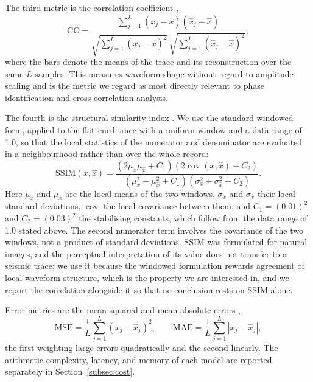\documentclass[fleqn,10pt]{wlscirep}
\begin{document}
The third metric is the correlation coefficient \cite{bendat2011random},
\begin{equation}
\mathrm{CC} =
\frac{\sum_{j=1}^{L} (x_j - \bar{x}) (\hat{x}_j - \bar{\hat{x}})}
     {\sqrt{\sum_{j=1}^{L} (x_j - \bar{x})^2} \, \sqrt{\sum_{j=1}^{L} (\hat{x}_j - \bar{\hat{x}})^2}} ,
\end{equation}
where the bars denote the means of the trace and its reconstruction over the same $L$ samples. This measures waveform shape without regard to amplitude scaling and is the metric we regard as most directly relevant to phase identification and cross-correlation analysis.

The fourth is the structural similarity index \cite{wang2006modern}. We use the standard windowed form, applied to the flattened trace with a uniform window and a data range of 1.0, so that the local statistics of the numerator and denominator are evaluated in a neighbourhood rather than over the whole record:
\begin{equation}
\mathrm{SSIM}(x, \hat{x}) =
\frac{(2 \mu_x \mu_{\hat{x}} + C_1)(2 \operatorname{cov}(x, \hat{x}) + C_2)}
     {(\mu_x^2 + \mu_{\hat{x}}^2 + C_1)(\sigma_x^2 + \sigma_{\hat{x}}^2 + C_2)} .
\end{equation}
Here $\mu_x$ and $\mu_{\hat{x}}$ are the local means of the two windows, $\sigma_x$ and $\sigma_{\hat{x}}$ their local standard deviations, $\operatorname{cov}$ the local covariance between them, and $C_1 = (0.01)^{2}$ and $C_2 = (0.03)^{2}$ the stabilising constants, which follow from the data range of 1.0 stated above. The second numerator term involves the covariance of the two windows, not a product of standard deviations. SSIM was formulated for natural images, and the perceptual interpretation of its value does not transfer to a seismic trace; we use it because the windowed formulation rewards agreement of local waveform structure, which is the property we are interested in, and we report the correlation alongside it so that no conclusion rests on SSIM alone.

Error metrics are the mean squared and mean absolute errors \cite{james2013introduction},
\begin{equation}
\mathrm{MSE} = \frac{1}{L} \sum_{j=1}^{L} (x_j - \hat{x}_j)^2,
\qquad
\mathrm{MAE} = \frac{1}{L} \sum_{j=1}^{L} \left| x_j - \hat{x}_j \right| ,
\end{equation}
the first weighting large errors quadratically and the second linearly. The arithmetic complexity, latency, and memory of each model are reported separately in Section~\ref{subsec:cost}.
\end{document}
